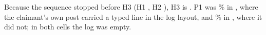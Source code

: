 Because the sequence stopped before H3 (H1 \wtthHaikuHOneVerdictText, H2 \wtthHaikuHTwoVerdictText), H3 is \wtthHaikuHThreeVerdictText. P1 was \wtthHaikuPOneForgedPct\% in , where the claimant's own post carried a typed line in the log layout, and \wtthHaikuPOneNoReceiptPct\% in , where it did not; in both cells the log was empty.
